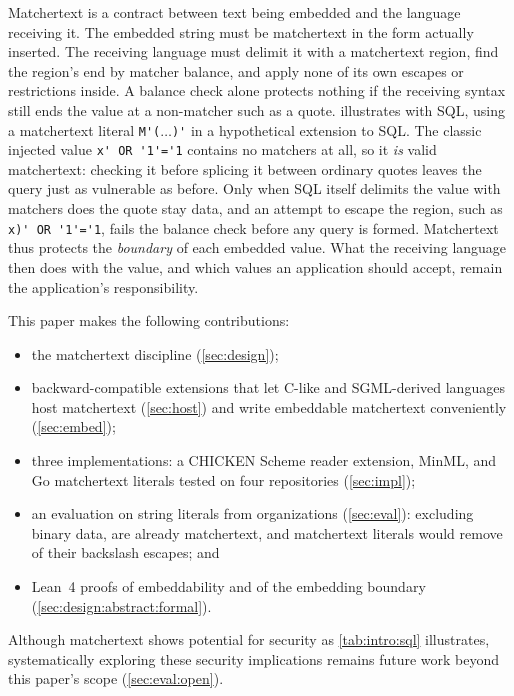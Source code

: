 Matchertext is a contract between
text being embedded and the language receiving it.
The embedded string must be matchertext
in the form actually inserted.
The receiving language must delimit it with a matchertext region,
find the region's end by matcher balance,
and apply none of its own escapes or restrictions inside.
A balance check alone protects nothing
if the receiving syntax still ends the value at a non-matcher such as a quote.
 illustrates with SQL,
using a matchertext literal \verb|M'(|$\dots$\verb|)'|
in a hypothetical extension to SQL.
The classic injected value \verb|x' OR '1'='1|
contains no matchers at all, so it \emph{is} valid matchertext:
checking it before splicing it between ordinary quotes
leaves the query just as vulnerable as before.
Only when SQL itself delimits the value with matchers
does the quote stay data,
and an attempt to escape the region, such as \verb|x)' OR '1'='1|,
fails the balance check before any query is formed.
Matchertext thus protects the \emph{boundary} of each embedded value.
What the receiving language then does with the value,
and which values an application should accept,
remain the application's responsibility.

This paper makes the following contributions:
\begin{itemize}
\item	the matchertext discipline (\cref{sec:design});
\item	backward-compatible extensions that let C-like and SGML-derived languages
	host matchertext (\cref{sec:host})
	and write embeddable matchertext conveniently (\cref{sec:embed});
\item	three implementations: a CHICKEN Scheme reader extension, MinML,
	and Go matchertext literals tested on four repositories (\cref{sec:impl});
\item	an evaluation on \dataStrSamples string literals from \dataOrgs organizations
	(\cref{sec:eval}): excluding binary data, \dataStrCompliance are already matchertext,
	and matchertext literals would remove \dataReduction of their backslash escapes; and
\item	Lean~4 proofs of embeddability and of the embedding boundary
	(\cref{sec:design:abstract:formal}).
\end{itemize}

Although matchertext shows potential for security
as \cref{tab:intro:sql} illustrates,
systematically exploring these security implications
remains future work beyond this paper's scope (\cref{sec:eval:open}).

